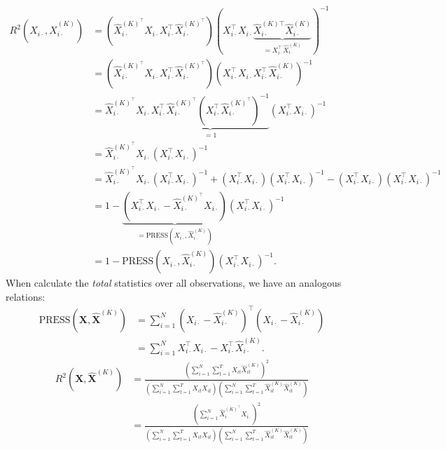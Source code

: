 \begin{align*}
    R^2 \left(X_{i\cdot}, \widehat{X}^{(K)}_{i\cdot}\right) 
    &=
    \left(\widehat{X}^{(K)^\top}_{i\cdot}X_{i\cdot} X_{i\cdot}^\top \widehat{X}^{(K)^\top}_{i\cdot} \right)
     \left(X_{i\cdot}^\top X_{i\cdot} \underbrace{\widehat{X}^{(K)\top}_{i\cdot}\widehat{X}^{(K)}_{i\cdot}}_{=X_{i\cdot}^\top \widehat{X}^{(K)}_{i\cdot}} \right)^{-1} \\
     &= 
     \left(\widehat{X}^{(K)^\top}_{i\cdot}X_{i\cdot} X_{i\cdot}^\top \widehat{X}^{(K)^\top}_{i\cdot} \right)
     \left(X_{i\cdot}^\top X_{i\cdot} X_{i\cdot}^\top \widehat{X}^{(K)}_{i\cdot} \right)^{-1} \\
     &=
     \widehat{X}^{(K)^\top}_{i\cdot}X_{i\cdot} \underbrace{X_{i\cdot}^\top \widehat{X}^{(K)^\top}_{i\cdot}
     \left(X_{i\cdot}^\top \widehat{X}^{(K)^\top}_{i\cdot} \right)^{-1}}_{=1}
     \left(X_{i\cdot}^\top X_{i\cdot}\right)^{-1}  \\
     &= \widehat{X}^{(K)^\top}_{i\cdot}X_{i\cdot}  \left(X_{i\cdot}^\top X_{i\cdot}\right)^{-1} \\
     &=
     \widehat{X}^{(K)^\top}_{i\cdot}X_{i\cdot}  \left(X_{i\cdot}^\top X_{i\cdot}\right)^{-1} + 
     \left(X_{i\cdot}^\top X_{i\cdot}\right)  \left(X_{i\cdot}^\top X_{i\cdot}\right)^{-1} -
     \left(X_{i\cdot}^\top X_{i\cdot}\right)  \left(X_{i\cdot}^\top X_{i\cdot}\right)^{-1} \\
     &= 
     1 - \underbrace{\left( X_{i\cdot}^\top X_{i\cdot} - \widehat{X}^{(K)^\top}_{i\cdot}X_{i\cdot} \right)}_{= \text{PRESS}\left(X_{i\cdot}, \widehat{X}^{(K)}_{i\cdot}\right)} \left(X_{i\cdot}^\top X_{i\cdot}\right)^{-1} \\
     &=
     1 - \text{PRESS}\left(X_{i\cdot}, \widehat{X}^{(K)}_{i\cdot}\right) \left(X_{i\cdot}^\top X_{i\cdot}\right)^{-1}.
\end{align*}
When calculate the \emph{total} statistics over all observations, we have an analogous relations:
\begin{align*}
     \text{PRESS}\left(\mathbf{X}, \widehat{\mathbf{X}}^{(K)}\right) &= \sum_{i=1}^N \left(X_{i\cdot} - \widehat{X}^{(K)}_{i\cdot}\right)^\top \left(X_{i\cdot} - \widehat{X}^{(K)}_{i\cdot}\right) \\
     &= \sum_{i=1}^N X_{i\cdot}^\top X_{i\cdot} - X_{i\cdot}^\top \widehat{X}^{(K)}_{i\cdot}.
\end{align*}
\begin{align*}
    R^2\left(\mathbf{X}, \widehat{\mathbf{X}}^{(K)}\right)
    &= \frac{\left(\sum_{i=1}^N \sum_{t=1}^T X_{it} \widehat{X}_{it}^{(K)}\right)^2}{
    \left(\sum_{i=1}^N \sum_{t=1}^T X_{it} X_{it}\right)
    \left(\sum_{i=1}^N \sum_{t=1}^T \widehat{X}_{it}^{(K)} \widehat{X}_{it}^{(K)}\right)
    } \\
    &= 
    \frac{\left(\sum_{i=1}^N \widehat{X}^{(K)^\top}_{i\cdot}X_{i\cdot} \right)^2}{
    \left(\sum_{i=1}^N \sum_{t=1}^T X_{it} X_{it}\right)
    \left(\sum_{i=1}^N \sum_{t=1}^T \widehat{X}_{it}^{(K)} \widehat{X}_{it}^{(K)}\right)
    } \\
\end{align*}

